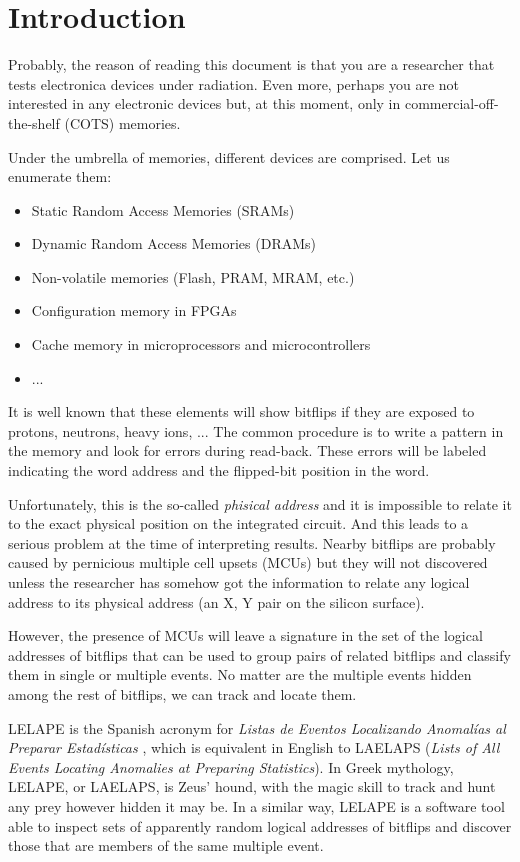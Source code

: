 \chapter{Introduction}
%
Probably, the reason of reading this document is that you are a researcher that tests electronica devices under radiation. Even more, perhaps you are not interested in any electronic devices but, at this moment, only in commercial-off-the-shelf (COTS) memories. 

Under the umbrella of memories, different devices are comprised. Let us enumerate them:
%
\begin{itemize}
	\item Static Random Access Memories (SRAMs)
	\item Dynamic Random Access Memories (DRAMs)
	\item Non-volatile memories (Flash, PRAM, MRAM, etc.)
	\item Configuration memory in FPGAs
	\item Cache memory in microprocessors and microcontrollers
	\item ...
\end{itemize}
%
It is well known that these elements will show bitflips if they are exposed to protons, neutrons, heavy ions, ... The common procedure is to write a pattern in the memory and look for errors during read-back. These errors will be labeled indicating the word address and the flipped-bit position in the word. 

Unfortunately, this is the so-called \textit{phisical address} and it is impossible to relate it to the exact physical position on the integrated circuit. And this leads to a serious problem at the time of interpreting results. Nearby bitflips are probably caused by pernicious multiple cell upsets (MCUs) but they will not discovered unless the researcher has somehow got the information to relate any logical address to its physical address (an X, Y pair on the silicon surface).

However, the presence of MCUs will leave a signature in the set of the logical addresses of bitflips that can be used to group pairs of related bitflips and classify them in single or multiple events. No matter are the multiple events hidden among the rest of bitflips, we can track and locate them.

LELAPE is the Spanish acronym for \textit{Listas de Eventos Localizando Anomalías al Preparar Estadísticas }, which is equivalent in English to LAELAPS (\textit{Lists of All Events Locating Anomalies at Preparing Statistics}). In Greek mythology, LELAPE, or LAELAPS, is Zeus' hound, with the magic skill to track and hunt any prey however hidden it may be. In a similar way, LELAPE is a software tool able to inspect sets of apparently random logical addresses of bitflips and discover those that are members of the same multiple event.